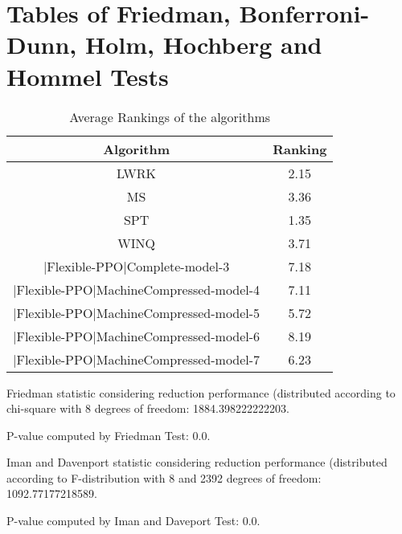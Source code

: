 \documentclass[a3paper,10pt]{article}
\author{}
\date{\today}
\begin{document}
\oddsidemargin 0in \topmargin 0in\maketitle
\section{Tables of Friedman, Bonferroni-Dunn, Holm, Hochberg and Hommel Tests}
\begin{table}[!htp]
\centering
\caption{Average Rankings of the algorithms
}\begin{tabular}{c|c}
Algorithm&Ranking\\
\hline
LWRK&2.15\\
MS&3.36\\
SPT&1.35\\
WINQ&3.71\\
|Flexible-PPO|Complete-model-3&7.18\\
|Flexible-PPO|MachineCompressed-model-4&7.11\\
|Flexible-PPO|MachineCompressed-model-5&5.72\\
|Flexible-PPO|MachineCompressed-model-6&8.19\\
|Flexible-PPO|MachineCompressed-model-7&6.23\\
\end{tabular}
\end{table}


Friedman statistic considering reduction performance (distributed according to chi-square with 8 degrees of freedom: 1884.398222222203.


P-value computed by Friedman Test: 0.0.\newline

Iman and Davenport statistic considering reduction performance (distributed according to F-distribution with 8 and 2392 degrees of freedom: 1092.77177218589.


P-value computed by Iman and Daveport Test: 0.0.\newline
\end{document}
